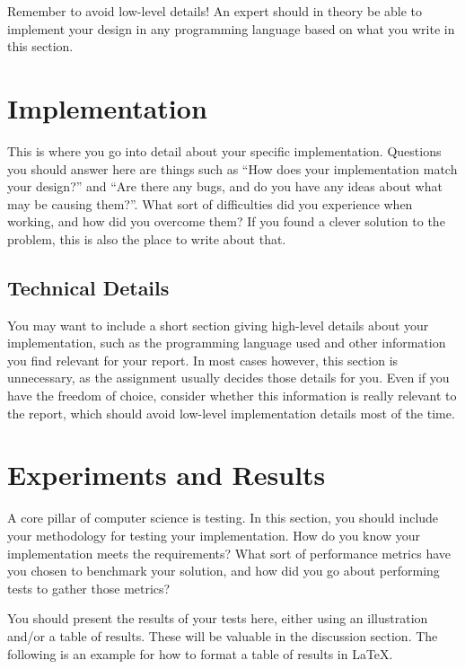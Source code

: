 \documentclass[conference]{IEEEtran}
\begin{document}
Remember to avoid low-level details! An expert should in theory be able to implement your design in any programming language based on what you write in this section.

\section{Implementation}\label{Section:Implementation}
This is where you go into detail about your specific implementation. Questions you should answer here are things such as ``How does your implementation match your design?'' and ``Are there any bugs, and do you have any ideas about what may be causing them?''. What sort of difficulties did you experience when working, and how did you overcome them? If you found a clever solution to the problem, this is also the place to write about that.

\subsection{Technical Details}\label{Subsection:Technical_details}
You may want to include a short section giving high-level details about your implementation, such as the programming language used and other information you find relevant for your report. In most cases however, this section is unnecessary, as the assignment usually decides those details for you. Even if you have the freedom of choice, consider whether this information is really relevant to the report, which should avoid low-level implementation details most of the time.

\section{Experiments and Results}\label{Section:Experiments and Results}
A core pillar of computer science is testing. In this section, you should include your methodology for testing your implementation. How do you know your implementation meets the requirements? What sort of performance metrics have you chosen to benchmark your solution, and how did you go about performing tests to gather those metrics?

You should present the results of your tests here, either using an illustration and/or a table of results. These will be valuable in the discussion section.
The following is an example for how to format a table of results in \LaTeX.
\end{document}
